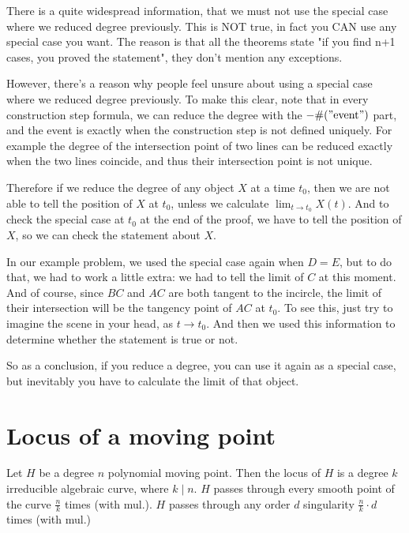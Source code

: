 \documentclass[a4paper]{article}
\begin{document}
\begin{remark}
    There is a quite widespread information, that we must not use the special case where we reduced degree previously. This is NOT true, in fact you CAN use any special case you want. The reason is that all the theorems state "if you find n+1 cases, you proved the statement", they don't mention any exceptions.

    However, there's a reason why people feel unsure about using a special case where we reduced degree previously. To make this clear, note that in every construction step formula, we can reduce the degree with the $-\#("\text{event}")$ part, and the event is exactly when the construction step is not defined uniquely. For example the degree of the intersection point of two lines can be reduced exactly when the two lines coincide, and thus their intersection point is not unique.

    Therefore if we reduce the degree of any object $X$ at a time $t_0$, then we are not able to tell the position of $X$ at $t_0$, unless we calculate $\lim_{t\to t_0}X(t)$. And to check the special case at $t_0$ at the end of the proof, we have to tell the position of $X$, so we can check the statement about $X$.

    In our example problem, we used the special case again when $D=E$, but to do that, we had to work a little extra: we had to tell the limit of $C$ at this moment. And of course, since $BC$ and $AC$ are both tangent to the incircle, the limit of their intersection will be the tangency point of $AC$ at $t_0$. To see this, just try to imagine the scene in your head, as $t\to t_0$. And then we used this information to determine whether the statement is true or not.

So as a conclusion, if you reduce a degree, you can use it again as a special case, but inevitably you have to calculate the limit of that object.
\end{remark}


\section{Locus of a moving point}


\begin{theorem} \label{locus}
    Let $H$ be a degree $n$ polynomial moving point. Then the locus of $H$ is a degree $k$ irreducible algebraic curve, where $k\mid n$. $H$ passes through every smooth point of the curve $\frac{n}{k}$ times (with  mul.). $H$ passes through any order $d$ singularity $\frac{n}{k}\cdot d$ times (with mul.)
\end{theorem}
\end{document}
